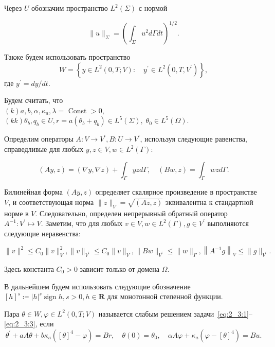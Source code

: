 Через $U$ обозначим пространство $L^{2}(\Sigma)$ с нормой

\[ \|u\|_{\Sigma}=\left(\int_{\Sigma} u^{2} d \Gamma d t\right)^{1 / 2}. \]


Также будем использовать пространство
\[
    W=\left\{y \in L^{2}(0, T ; V): \quad y^{\prime}
    \in L^{2}\left(0, T, V^{\prime}\right)\right\},
\]
где $y^{\prime}=d y / d t$.

Будем считать, что \\
$(k) a, b, \alpha, \kappa_{a}, \lambda=$ Const $>0$, \\
$(kk) \theta_{b}, q_{b} \in U, r=a\left(\theta_{b}+q_{b}\right)
\in L^{5}(\Sigma), \; \theta_{0} \in L^{5}(\Omega)$.


Определим операторы $A: V \rightarrow V^{\prime}, B: U \rightarrow V^{\prime}$,
используя следующие равенства, справедливые для любых
$y, z \in V, w \in L^{2}(\Gamma)$:

\[
    (A y, z)=(\nabla y, \nabla z)+\int_{\Gamma} y z d \Gamma,
    \quad(B w, z)=\int_{\Gamma} w z d \Gamma.
\]

Билинейная форма $(A y, z)$ определяет скалярное произведение в пространстве $V$,
и соответствующая норма $\|z\|_{V}=\sqrt{(A z, z)}$ эквивалентна к стандартной норме в $V$.
Следовательно, определен непрерывный обратный оператор $A^{-1}: V^{\prime} \mapsto V$.
Заметим, что для любых $v \in V, w \in L^{2}(\Gamma), g \in V^{\prime}$
выполняются следующие неравенства:

\[
    \|v\|^{2} \leq C_{0}\|v\|_{V}^{2},\|v\|_{V^{\prime}} \leq C_{0}\|v\|_{V},\|B w\|_{V^{\prime}}
    \leq\|w\|_{\Gamma},\left\|A^{-1} g\right\|_{V} \leq\|g\|_{V^{\prime}}.
\]

Здесь константа $C_{0}>0$ зависит только от домена $\Omega$.

В дальнейшем будем использовать следующие обозначение
$[h]^{s} \coloneqq |h|^{s} \operatorname{sign} h, s>0, h \in \mathbf{R}$
для монотонной степенной функции.


\begin{definition}
    Пара $\theta \in W, \varphi \in L^{2}(0, T ; V)$ называется слабым
    решением задачи~\eqref{eq:2_3:1}--\eqref{eq:2_3:3}, если
    \begin{equation}
        \label{eq:2_3:6}
        \theta^{\prime}+a A \theta+b \kappa_{a}\left([\theta]^{4}-\varphi\right)=B r,
        \quad \theta(0)=\theta_{0}, \quad \alpha A \varphi
        + \kappa_{a}\left(\varphi-[\theta]^{4}\right)=B u.
    \end{equation}
\end{definition}

